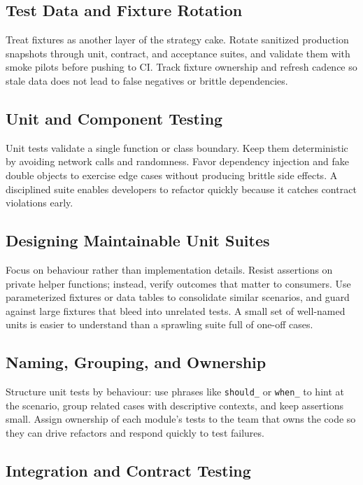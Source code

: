 \subsection{Test Data and Fixture Rotation}

Treat fixtures as another layer of the strategy cake. Rotate sanitized production snapshots through unit, contract, and acceptance suites, and validate them with smoke pilots before pushing to CI. Track fixture ownership and refresh cadence so stale data does not lead to false negatives or brittle dependencies.

\subsection{Unit and Component Testing}

Unit tests validate a single function or class boundary. Keep them deterministic by avoiding network calls and randomness. Favor dependency injection and fake double objects to exercise edge cases without producing brittle side effects. A disciplined suite enables developers to refactor quickly because it catches contract violations early.

\subsection{Designing Maintainable Unit Suites}

Focus on behaviour rather than implementation details. Resist assertions on private helper functions; instead, verify outcomes that matter to consumers. Use parameterized fixtures or data tables to consolidate similar scenarios, and guard against large fixtures that bleed into unrelated tests. A small set of well-named units is easier to understand than a sprawling suite full of one-off cases.

\subsection{Naming, Grouping, and Ownership}

Structure unit tests by behaviour: use phrases like \texttt{should\_} or \texttt{when\_} to hint at the scenario, group related cases with descriptive contexts, and keep assertions small. Assign ownership of each module's tests to the team that owns the code so they can drive refactors and respond quickly to test failures.

\subsection{Integration and Contract Testing}

